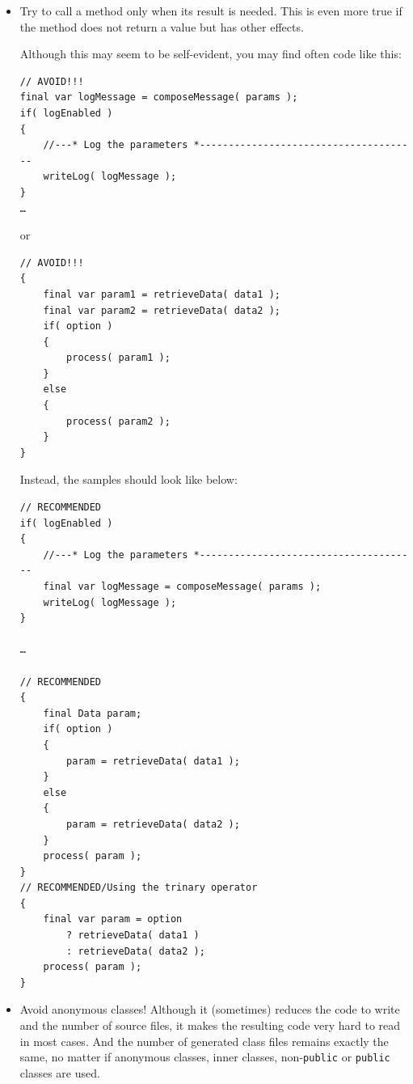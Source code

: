 \begin{itemize}
{\begin{lstlisting}
    /**
     *  Creates a new instance for {@code MyClass}.
     */
    public MyClass() 
    {                                                
        // INSTEAD DO IT IN THE CONSTRUCTOR!!
        final var propertyName = readConfig( "user.property" );
        m_Field = System.getProperty( propertyName );
    }   //  MyClass()
}
//  class MyClass    
\end{lstlisting}}

\item{Try to call a method only when its result is needed. This is even more true if the method does not return a value but has other effects.

Although this may seem to be self-evident, you may find often code like this:
\begin{lstlisting}
// AVOID!!!
final var logMessage = composeMessage( params );
if( logEnabled )
{
    //---* Log the parameters *--------------------------------------
    writeLog( logMessage );
}
…
\end{lstlisting}
or
\begin{lstlisting}
// AVOID!!!
{
    final var param1 = retrieveData( data1 );
    final var param2 = retrieveData( data2 );
    if( option )
    {
        process( param1 );
    }
    else
    {
        process( param2 );
    }
}
\end{lstlisting}
Instead, the samples should look like below:
\begin{lstlisting}
// RECOMMENDED
if( logEnabled )
{
    //---* Log the parameters *--------------------------------------
    final var logMessage = composeMessage( params );
    writeLog( logMessage );
}

…

// RECOMMENDED
{
    final Data param;
    if( option )
    {
        param = retrieveData( data1 );
    }
    else
    {
        param = retrieveData( data2 );
    }
    process( param );
}
// RECOMMENDED/Using the trinary operator
{
    final var param = option 
        ? retrieveData( data1 )
        : retrieveData( data2 );
    process( param );
}
\end{lstlisting}
}

\item{Avoid anonymous classes! Although it (sometimes) reduces the code to write and the number of source files, it makes the resulting code very hard to read in most cases. And the number of generated class files remains exactly the same, no matter if anonymous classes, inner classes, non-\lstinline|public| or \lstinline|public| classes are used.

}
\end{itemize}
